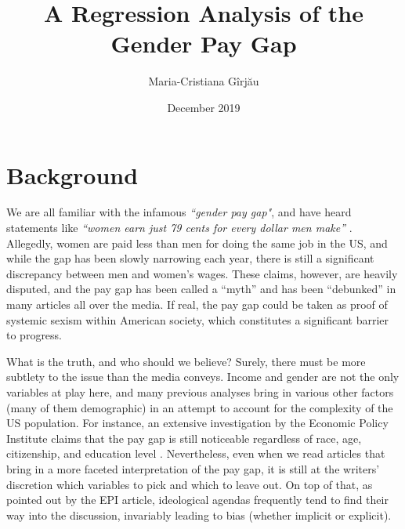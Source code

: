 \documentclass{article}
\author{Maria-Cristiana Gîrjău}
\date{December 2019}
\begin{document}


\begin{singlespace}
    \title{A Regression Analysis of the Gender Pay Gap}
    \maketitle
    \tableofcontents
\end{singlespace}

\newpage

\section{Background}

We are all familiar with the infamous \textit{``gender pay gap"}, and have heard statements like \textit{``women earn just 79 cents for every dollar men make''} \cite{cnbc}. Allegedly, women are paid less than men for doing the same job in the US, and while the gap has been slowly narrowing each year, there is still a significant discrepancy between men and women's wages. These claims, however, are heavily disputed, and the pay gap has been called a ``myth'' and has been ``debunked'' in many articles all over the media. If real, the pay gap could be taken as proof of systemic sexism within American society, which constitutes a significant barrier to progress.

What is the truth, and who should we believe? Surely, there must be more subtlety to the issue than the media conveys. Income and gender are not the only variables at play here, and many previous analyses bring in various other factors (many of them demographic) in an attempt to account for the complexity of the US population. For instance, an extensive investigation by the Economic Policy Institute claims that the pay gap is still noticeable regardless of race, age, citizenship, and education level \cite{epi}. Nevertheless, even when we read articles that bring in a more faceted interpretation of the pay gap, it is still at the writers' discretion which variables to pick and which to leave out. On top of that, as pointed out by the EPI article, ideological agendas frequently tend to find their way into the discussion, invariably leading to bias (whether implicit or explicit).
\end{document}
